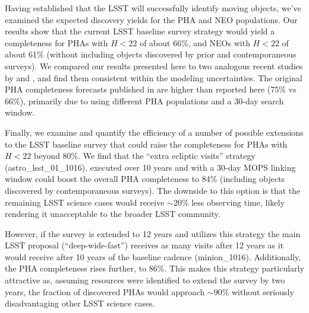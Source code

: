
Having established that the LSST will successfully identify moving objects, we've examined the expected discovery yields for the PHA and NEO populations. Our results show that the current LSST baseline survey strategy would yield a completeness for PHAs with $H<22$ of about 66\%, and NEOs with $H<22$ of about 61\% (without including objects discovered by prior and contemporaneous surveys). We compared our results presented here to two analogous recent studies by \citet[]{GMS2016} and \citet{VeresChesley2017neo}, and find them consistent within the modeling uncertainties. The original
PHA completeness forecasts published in \cite{IvezicNEO2007} are higher than reported here (75\% vs 66\%), primarily due to using different PHA populations and a 30-day search window.

Finally, we examine and quantify the efficiency of a number of possible extensions to the LSST baseline survey that could raise the
completeness for PHAs with $H<22$ beyond 80\%. We find that the ``extra ecliptic visits'' strategy (astro\_lsst\_01\_1016), executed over 10 years and with a 30-day MOPS linking window could boost the overall PHA completeness to 84\% (including objects discovered by contemporaneous surveys). The downside to this option is that the remaining LSST science cases would receive $\sim 20$\% less observing time, likely rendering it unacceptable to the broader LSST community.

However, if the survey is extended to 12 years and utilizes this strategy the main LSST proposal (``deep-wide-fast'') receives as many visits after 12 years as it would receive after 10 years of the
baseline cadence (minion\_1016). Additionally, the PHA completeness rises further, to 86\%. This makes this strategy particularly attractive as, assuming resources were identified to extend the survey by two years, the fraction of discovered PHAs would approach $\sim 90$\% without seriously disadvantaging other LSST science cases.
